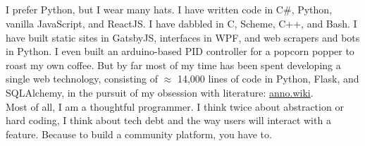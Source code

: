 \documentclass[9pt]{developercv} %
\begin{document}
\begin{minipage}[t]{0.275\textwidth} %
    \vspace{-\baselineskip} %

    \\
    \\
    \\
    \\
\end{minipage}



    I prefer Python, but I wear many hats. I have written code in C\#,
    Python, vanilla JavaScript, and ReactJS. I have dabbled in C, Scheme, C++,
    and Bash. I have built static sites in GatsbyJS, interfaces in WPF, and web
    scrapers and bots in Python. I even built an arduino-based PID controller
    for a popcorn popper to roast my own coffee. But by far most of my time has
    been spent developing a single web technology, consisting of $\approx$
    14,000 lines of code in Python, Flask, and SQLAlchemy, in the pursuit of my
    obsession with literature:
    {\href{https://github.com/malan88/icc}{anno.wiki}}.\\

    Most of all, I am a thoughtful programmer. I think twice about abstraction
    or hard coding, I think about tech debt and the way users will interact
    with a feature. Because to build a community platform, you have to.

\end{document}
